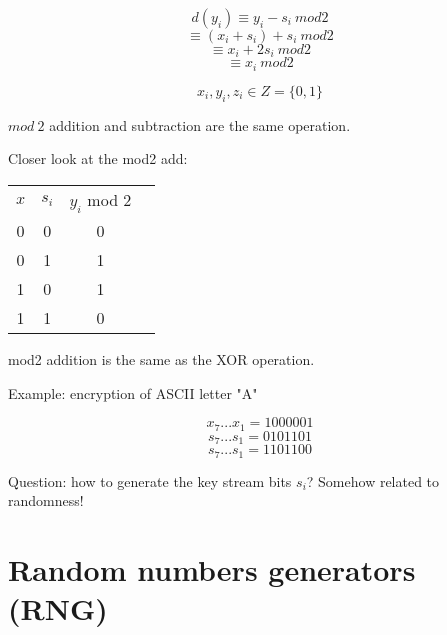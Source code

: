 \documentclass[a4paper]{article}
\begin{document}
$$d(y_i) \equiv y_i -s_i \ mod 2$$
$$ \equiv (x_i + s_i) + s_i \ mod 2$$
$$ \equiv x_i + 2s_i \ mod 2$$
$$ \equiv x_i \ mod 2$$


$$x_i, y_i, z_i \in Z = \{ 0, 1\}$$

$mod \ 2$ addition and subtraction are the same operation.

Closer look at the mod2 add:


\begin{center}
    \begin{tabular}{c c c c}
        $x$ & $s_i$ & $y_i$ mod 2 \\
        0 & 0 & 0 \\
        0 & 1 & 1 \\
        1 & 0 & 1 \\
        1 & 1 & 0
\end{tabular}
\end{center}

mod2 addition is the same as the XOR operation.

Example: encryption of ASCII letter "A"

$$x_7...x_1=1000001$$
$$s_7...s_1=0101101$$
$$s_7...s_1=1101100$$

Question: how to generate the key stream bits $s_i$?
Somehow related to randomness!

\section{Random numbers generators (RNG)}
\end{document}
